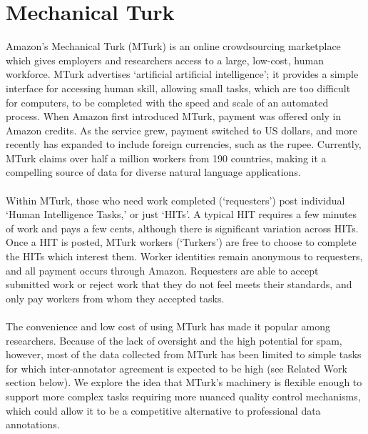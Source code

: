 \documentclass[11pt]{article}
\begin{document}
\section{Mechanical Turk}
Amazon's Mechanical Turk (MTurk) is an online crowdsourcing marketplace which gives employers and researchers access to a large, low-cost, human workforce. MTurk advertises `artificial artificial intelligence'; it provides a simple interface for accessing human skill, allowing small tasks, which are too difficult for computers, to be completed with the speed and scale of an automated process. When Amazon first introduced MTurk, payment was offered only in Amazon credits. As the service grew, payment switched to US dollars, and more recently has expanded to include foreign currencies, such as the rupee. Currently, MTurk claims over half a million workers from 190 countries, making it a compelling source of data for diverse natural language applications.\\\\
Within MTurk, those who need work completed (`requesters') post individual `Human Intelligence Tasks,' or just `HITs'. A typical HIT  requires a few minutes of work and pays a few cents, although there is significant variation across HITs. Once a HIT is posted, MTurk workers (`Turkers') are free to choose to complete the HITs which interest them. Worker identities remain anonymous to requesters, and all payment occurs through Amazon. Requesters are able to accept submitted work or reject work that they do not feel meets their standards, and only pay workers from whom they accepted tasks. \\\\
The convenience and low cost of using MTurk has made it popular among researchers. Because of the lack of oversight and the high potential for spam, however, most of the data collected from MTurk has been limited to simple tasks for which inter-annotator agreement is expected to be high (see Related Work section below). We explore the idea that MTurk's machinery is flexible enough to support more complex tasks requiring more nuanced quality control mechanisms, which could allow it to be a competitive alternative to professional data annotations.
\end{document}
